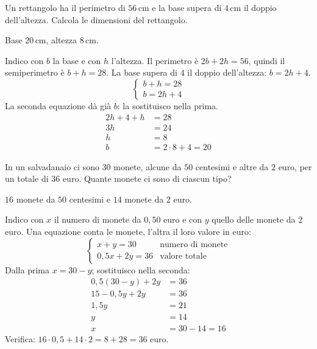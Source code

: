 
\begin{question}[ID=3.3, subtitle={Dimensioni di un rettangolo}, difficulty=media, tags={sistemi, problemi}]
Un rettangolo ha il perimetro di $56\,\text{cm}$ e la base supera di $4\,\text{cm}$ il doppio dell'altezza. Calcola le dimensioni del rettangolo.
\begin{solution}
Base $20\,\text{cm}$, altezza $8\,\text{cm}$.
\end{solution}
\begin{explanation}
Indico con $b$ la base e con $h$ l'altezza. Il perimetro è $2b+2h=56$, quindi il semiperimetro è $b+h=28$. La base supera di $4$ il doppio dell'altezza: $b=2h+4$.
\[ \begin{cases} b+h=28\\ b=2h+4\end{cases} \]
La seconda equazione dà già $b$: la sostituisco nella prima.
\[\begin{aligned}
2h+4+h &= 28\\
3h &= 24\\
h &= 8\\
b &= 2\cdot8+4=20
\end{aligned}\]
\end{explanation}
\end{question}


\begin{question}[ID=3.4, subtitle={Monete in un salvadanaio}, difficulty=difficile, tags={sistemi, problemi}]
In un salvadanaio ci sono $30$ monete, alcune da $50$ centesimi e altre da $2$ euro, per un totale di $36$ euro. Quante monete ci sono di ciascun tipo?
\begin{solution}
$16$ monete da $50$ centesimi e $14$ monete da $2$ euro.
\end{solution}
\begin{explanation}
Indico con $x$ il numero di monete da $0{,}50$ euro e con $y$ quello delle monete da $2$ euro. Una equazione conta le monete, l'altra il loro valore in euro:
\[ \begin{cases} x+y=30 & \text{numero di monete}\\ 0{,}5x+2y=36 & \text{valore totale}\end{cases} \]
Dalla prima $x=30-y$; sostituisco nella seconda:
\[\begin{aligned}
0{,}5(30-y)+2y &= 36\\
15-0{,}5y+2y &= 36\\
1{,}5y &= 21\\
y &= 14\\
x &= 30-14=16
\end{aligned}\]
Verifica: $16\cdot0{,}5+14\cdot2=8+28=36$ euro.
\end{explanation}
\end{question}

